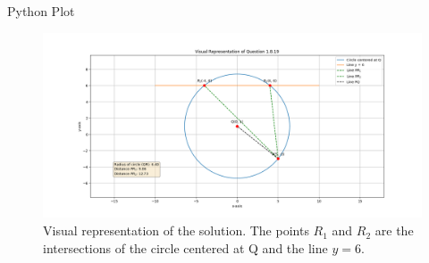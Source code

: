 \documentclass{beamer}
\begin{document}
\begin{frame}{Python Plot}
    \begin{figure}
        \centering
        \includegraphics[width=0.8\columnwidth]{../figs/figure_c.png}
        \caption{Visual representation of the solution. The points $R_1$ and $R_2$ are the intersections of the circle centered at Q and the line $y=6$.}
        \label{fig:fig}
    \end{figure}
\end{frame}
\end{document}
